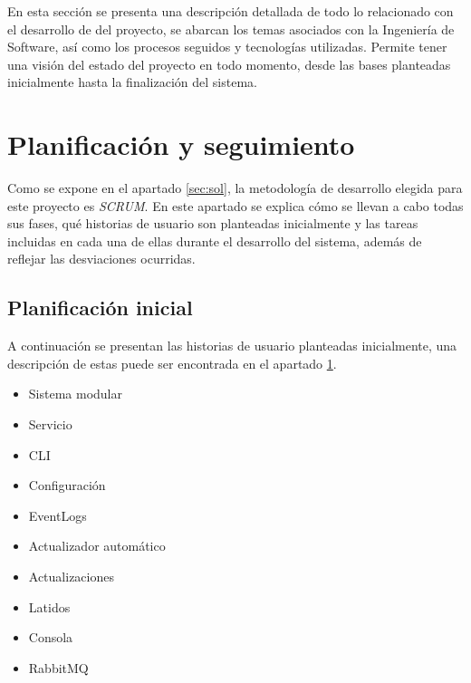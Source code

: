 En esta sección se presenta una descripción detallada de todo lo relacionado con el desarrollo de del proyecto, se abarcan los temas asociados con la Ingeniería de Software, así como los procesos seguidos y tecnologías utilizadas. Permite tener una visión del estado del proyecto en todo momento, desde las bases planteadas inicialmente hasta la finalización del sistema.

\section{Planificación y seguimiento} \label{sec:plan}
    
    Como se expone en el apartado \ref{sec:sol}, la metodología de desarrollo elegida para este proyecto es \textit{SCRUM}.  En este apartado se explica cómo se llevan a cabo todas sus fases, qué historias de usuario son planteadas inicialmente y las tareas incluidas en cada una de ellas durante el desarrollo del sistema, además de reflejar las desviaciones ocurridas.
    
    \subsection{Planificación inicial}
        
        A continuación se presentan las historias de usuario planteadas inicialmente, una descripción de estas puede ser encontrada en el apartado \ref{sec:plan}.
        
        \begin{itemize}
            \item Sistema modular
            \item Servicio
            \item CLI
            \item Configuración
            \item EventLogs
            \item Actualizador automático
            \item Actualizaciones
            \item Latidos
            \item Consola
            \item RabbitMQ
        \end{itemize}
    
